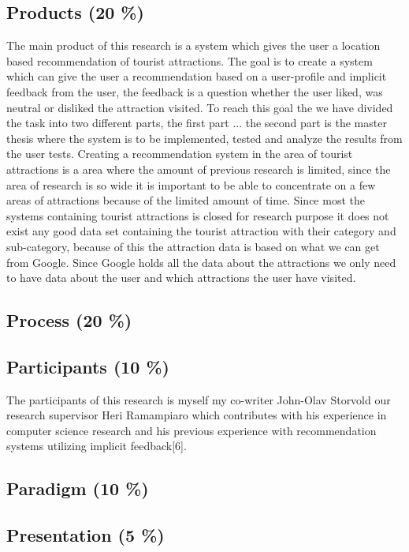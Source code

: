 \documentclass[12pt,runningheads]{article}
\begin{document}
\subsection*{Products (20 \%)}
The main product of this research is a system which gives the user a location based recommendation of tourist attractions. The goal is to create a system which can give the user a recommendation based on a user-profile and implicit feedback from the user, the feedback is a question whether the user liked, was neutral or disliked the attraction visited. To reach this goal the we have divided the task into two different parts, the first part ... the second part is the master thesis where the system is to be implemented, tested and analyze the results from the user tests. \newline\newline Creating a recommendation system in the area of tourist attractions is a area where the amount of previous research is limited, since the area of research is so wide it is important to be able to concentrate on a few areas of attractions because of the limited amount of time. Since most the systems containing tourist attractions is closed for research purpose it does not exist any good data set containing the tourist attraction with their category and sub-category, because of this the attraction data is based on what we can get from Google. Since Google holds all the data about the attractions we only need to have data about the user and which attractions the user have visited. 

\subsection*{Process (20 \%)}

\subsection*{Participants (10 \%)}
The participants of this research is myself my co-writer John-Olav Storvold our research supervisor Heri Ramampiaro which contributes with his experience in computer science research and his previous experience with recommendation systems utilizing implicit feedback[6].

\subsection*{Paradigm (10 \%)}
\subsection*{Presentation (5 \%)}
\end{document}
